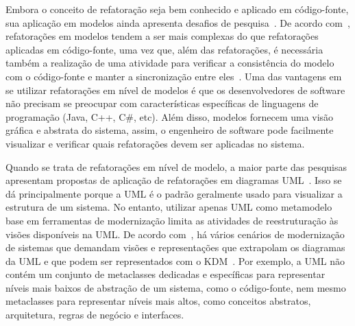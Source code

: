 





Embora o conceito de refatoração seja bem conhecido e aplicado em código-fonte, sua aplicação em modelos ainda apresenta desafios de pesquisa~\cite{Gorp}. De acordo com~, refatorações em modelos tendem a ser mais complexas do que refatorações aplicadas em código-fonte, uma vez que, além das refatorações, é necessária também a realização de uma atividade para verificar a consistência do modelo com o código-fonte e manter a sincronização entre eles~\cite{KolahdouzRahimi20145}. Uma das vantagens em se utilizar refatorações em nível de modelos é que os desenvolvedores de software não precisam se preocupar com características específicas de linguagens de programação (Java, C++, C\#, etc). Além disso, modelos fornecem uma visão gráfica e abstrata do sistema, assim, o engenheiro de software pode facilmente visualizar e verificar quais refatorações devem ser aplicadas no sistema. 

Quando se trata de refatorações em nível de modelo, a maior parte das pesquisas apresentam propostas de aplicação de refatorações em diagramas UML~\cite{Salem_2008, Gorp, Egyed_2008, Briand_2006, staron2004implementing, revisao_sistematica_uml_refactoring}. Isso se dá principalmente porque a UML é o padrão geralmente usado para visualizar a estrutura de um sistema. No entanto, utilizar apenas UML como metamodelo base em ferramentas de modernização limita as atividades de reestruturação às visões disponíveis na UML. De acordo com~, há vários cenários de modernização de sistemas que demandam visões e representações que extrapolam os diagramas da UML e que podem ser representados com o KDM~\cite{Gorp, KolahdouzRahimi20145, revisao_sistematica_uml_refactoring, durelli_systematic_mapping}. Por exemplo, a UML não contém um conjunto de metaclasses dedicadas e específicas para representar níveis mais baixos de abstração de um sistema, como o código-fonte, nem mesmo metaclasses para representar níveis mais altos, como conceitos abstratos, arquitetura, regras de negócio e interfaces.


